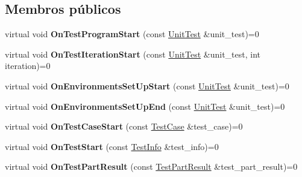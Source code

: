 \subsection*{Membros públicos}
\begin{DoxyCompactItemize}
\item 
\hypertarget{classtesting_1_1TestEventListener_a5f6c84f39851e8a603a2d2e10063816b}{virtual void {\bfseries On\-Test\-Program\-Start} (const \hyperlink{classtesting_1_1UnitTest}{Unit\-Test} \&unit\-\_\-test)=0}\label{classtesting_1_1TestEventListener_a5f6c84f39851e8a603a2d2e10063816b}

\item 
\hypertarget{classtesting_1_1TestEventListener_a60cc09b7907cb329d152eb5e7133bdeb}{virtual void {\bfseries On\-Test\-Iteration\-Start} (const \hyperlink{classtesting_1_1UnitTest}{Unit\-Test} \&unit\-\_\-test, int iteration)=0}\label{classtesting_1_1TestEventListener_a60cc09b7907cb329d152eb5e7133bdeb}

\item 
\hypertarget{classtesting_1_1TestEventListener_aa6502e534919605be45f26a6daf9a40c}{virtual void {\bfseries On\-Environments\-Set\-Up\-Start} (const \hyperlink{classtesting_1_1UnitTest}{Unit\-Test} \&unit\-\_\-test)=0}\label{classtesting_1_1TestEventListener_aa6502e534919605be45f26a6daf9a40c}

\item 
\hypertarget{classtesting_1_1TestEventListener_aaa1021d75f5dbf3f05c829c1cc520341}{virtual void {\bfseries On\-Environments\-Set\-Up\-End} (const \hyperlink{classtesting_1_1UnitTest}{Unit\-Test} \&unit\-\_\-test)=0}\label{classtesting_1_1TestEventListener_aaa1021d75f5dbf3f05c829c1cc520341}

\item 
\hypertarget{classtesting_1_1TestEventListener_ab4ed885d63f5bbff8076c1329b3dfe36}{virtual void {\bfseries On\-Test\-Case\-Start} (const \hyperlink{classtesting_1_1TestCase}{Test\-Case} \&test\-\_\-case)=0}\label{classtesting_1_1TestEventListener_ab4ed885d63f5bbff8076c1329b3dfe36}

\item 
\hypertarget{classtesting_1_1TestEventListener_ab4f6a0ca16ae75daf385b3b5914e1048}{virtual void {\bfseries On\-Test\-Start} (const \hyperlink{classtesting_1_1TestInfo}{Test\-Info} \&test\-\_\-info)=0}\label{classtesting_1_1TestEventListener_ab4f6a0ca16ae75daf385b3b5914e1048}

\item 
\hypertarget{classtesting_1_1TestEventListener_a054f8705c883fa120b91473aff38f2ee}{virtual void {\bfseries On\-Test\-Part\-Result} (const \hyperlink{classtesting_1_1TestPartResult}{Test\-Part\-Result} \&test\-\_\-part\-\_\-result)=0}\label{classtesting_1_1TestEventListener_a054f8705c883fa120b91473aff38f2ee}


\end{DoxyCompactItemize}

